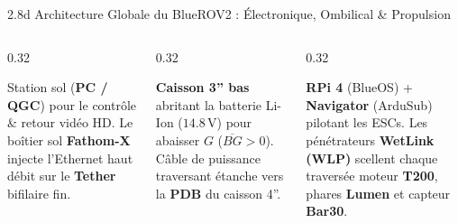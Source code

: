 \begin{frame}{2.8d Architecture Globale du BlueROV2 : Électronique, Ombilical \& Propulsion}

  \vspace{0.1em}
  \begin{columns}[T, onlytextwidth]
    \begin{column}{0.32\textwidth}
      \begin{block}{}
        \scriptsize
        Station sol (\textbf{PC / QGC}) pour le contrôle \& retour vidéo HD. Le boîtier sol \textbf{Fathom-X} injecte l'Ethernet haut débit sur le \textbf{Tether} bifilaire fin.
      \end{block}
    \end{column}

    \begin{column}{0.32\textwidth}
      \begin{block}{}
        \scriptsize
        \textbf{Caisson 3'' bas} abritant la batterie Li-Ion ($14.8\,\text{V}$) pour abaisser $G$ ($\overline{BG}>0$). Câble de puissance traversant étanche vers la \textbf{PDB} du caisson 4''.
      \end{block}
    \end{column}

    \begin{column}{0.32\textwidth}
      \begin{block}{}
        \scriptsize
        \textbf{RPi 4} (BlueOS) + \textbf{Navigator} (ArduSub) pilotant les ESCs. Les pénétrateurs \textbf{WetLink (WLP)} scellent chaque traversée moteur \textbf{T200}, phares \textbf{Lumen} et capteur \textbf{Bar30}.
      \end{block}
    \end{column}
  \end{columns}
\end{frame}

